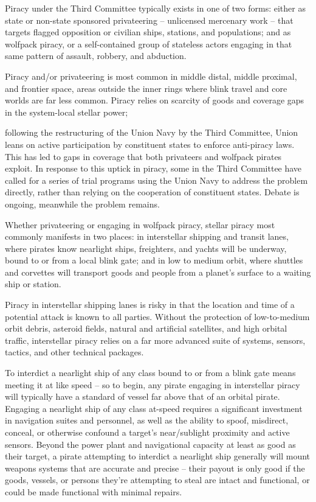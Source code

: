 Piracy under the Third Committee typically exists in one of two forms: either as state or non-state
sponsored privateering -- unlicensed mercenary work -- that targets flagged opposition or
civilian ships, stations, and populations; and as wolfpack piracy, or a self-contained group of
stateless actors engaging in that same pattern of assault, robbery, and abduction.


Piracy and/or privateering is most common in middle distal, middle proximal, and frontier space,
areas outside the inner rings where blink travel and core worlds are far less common. Piracy
relies on scarcity of goods and coverage gaps in the system-local stellar power;

following the restructuring of the Union Navy by the Third Committee, Union leans on active
participation by constituent states to enforce anti-piracy laws. This has led to gaps in coverage
that both privateers and wolfpack pirates exploit. In response to this uptick in piracy, some in the
Third Committee have called for a series of trial programs using the Union Navy to address the
problem directly, rather than relying on the cooperation of constituent states. Debate is ongoing,
meanwhile the problem remains.


Whether privateering or engaging in wolfpack piracy, stellar piracy most commonly manifests in
two places: in interstellar shipping and transit lanes, where pirates know nearlight ships,
freighters, and yachts will be underway, bound to or from a local blink gate; and in low to
medium orbit, where shuttles and corvettes will transport goods and people from a planet’s
surface to a waiting ship or station.


Piracy in interstellar shipping lanes is risky in that the location and time of a potential attack is
known to all parties. Without the protection of low-to-medium orbit debris, asteroid fields, natural
and artificial satellites, and high orbital traffic, interstellar piracy relies on a far more advanced
suite of systems, sensors, tactics, and other technical packages.


To interdict a nearlight ship of any class bound to or from a blink gate means meeting it at like
speed -- so to begin, any pirate engaging in interstellar piracy will typically have a standard of
vessel far above that of an orbital pirate. Engaging a nearlight ship of any class at-speed requires
a significant investment in navigation suites and personnel, as well as the ability to spoof,
misdirect, conceal, or otherwise confound a target’s near/sublight proximity and active sensors.
Beyond the power plant and navigational capacity at least as good as their target, a pirate
attempting to interdict a nearlight ship generally will mount weapons systems that are accurate
and precise -- their payout is only good if the goods, vessels, or persons they’re attempting to
steal are intact and functional, or could be made functional with minimal repairs.





